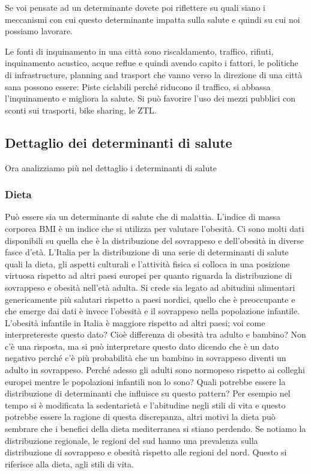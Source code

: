 Se voi pensate ad un determinante dovete poi riflettere su quali siano i
meccanismi con cui questo determinante impatta sulla salute e quindi su
cui noi possiamo lavorare.

Le fonti di inquinamento in una città sono riscaldamento, traffico,
rifiuti, inquinamento acustico, acque reflue e quindi avendo capito i
fattori, le politiche di infrastructure, planning and trasport che vanno
verso la direzione di una città sana possono essere: Piste ciclabili
perché riducono il traffico, si abbassa l'inquinamento e migliora la
salute. Si può favorire l'uso dei mezzi pubblici con sconti sui
trasporti, bike sharing, le ZTL.

\subsection{Dettaglio dei determinanti di salute}

Ora analizziamo più nel dettaglio i determinanti di salute

\subsubsection{Dieta} 

Può essere sia un determinante di salute che di malattia. L'indice di
massa corporea BMI è un indice che si utilizza per valutare l'obesità.
Ci sono molti dati disponibili su quella che è la distribuzione del
sovrappeso e dell'obesità in diverse fasce d'età. L'Italia per la
distribuzione di una serie di determinanti di salute quali la dieta, gli
aspetti culturali e l'attività fisica si colloca in una posizione
virtuosa rispetto ad altri paesi europei per quanto riguarda la
distribuzione di sovrappeso e obesità nell'età adulta. Si crede sia
legato ad abitudini alimentari genericamente più salutari rispetto a
paesi nordici, quello che è preoccupante e che emerge dai dati è invece
l'obesità e il sovrappeso nella popolazione infantile. L'obesità
infantile in Italia è maggiore rispetto ad altri paesi; voi come
interpretereste questo dato? Cioè differenza di obesità tra adulto e
bambino? Non c'è una risposta, ma si può interpretare questo dato
dicendo che è un dato negativo perché c'è più probabilità che un bambino
in sovrappeso diventi un adulto in sovrappeso. Perché adesso gli adulti
sono normopeso rispetto ai colleghi europei mentre le popolazioni
infantili non lo sono? Quali potrebbe essere la distribuzione di
determinanti che influisce su questo pattern? Per esempio nel tempo si è
modificata la sedentarietà e l'abitudine negli stili di vita e questo
potrebbe essere la ragione di questa discrepanza, altri motivi la dieta
può sembrare che i benefici della dieta mediterranea si stiano perdendo.
Se notiamo la distribuzione regionale, le regioni del sud hanno una
prevalenza sulla distribuzione di sovrappeso e obesità rispetto alle
regioni del nord. Questo si riferisce alla dieta, agli stili di vita.

